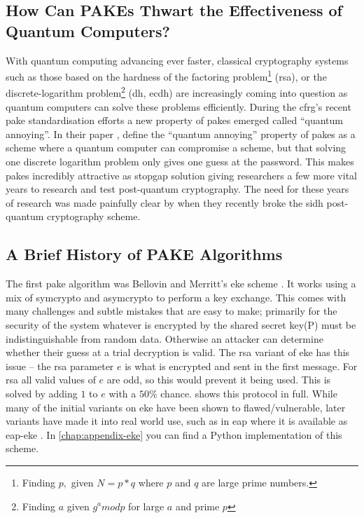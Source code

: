 \subsection{How Can PAKEs Thwart the Effectiveness of Quantum Computers?}
With quantum computing advancing ever faster, classical cryptography systems such as those based on the hardness of the factoring problem\footnote{Finding $p,$ given $N = p * q$ where $p$ and $q$ are large prime numbers.} (\gls{rsa}), or the discrete-logarithm problem\footnote{Finding $a$ given $g^a mod p$ for large $a$ and prime $p$} (\gls{dh}, \gls{ecdh}) are increasingly coming into question as quantum computers can solve these problems efficiently.
During the \gls{cfrg}'s recent \gls{pake} standardisation efforts a new property of \glspl{pake} emerged called \enquote{quantum annoying}.
In their paper  \cite{quantum-annoying}, \citeauthor{quantum-annoying} define the \enquote{quantum annoying} property of \glspl{pake} as a scheme where a quantum computer can compromise a scheme, but that solving one discrete logarithm problem only gives one guess at the password.
This makes \glspl{pake} incredibly attractive as stopgap solution giving researchers a few more vital years to research and test post-quantum cryptography.
The need for these years of research was made painfully clear by \textcite{break-sidh} when they recently broke the \gls{sidh} post-quantum cryptography scheme.

\clearpage

\subsection{A Brief History of PAKE Algorithms}
The first \gls{pake} algorithm was Bellovin and Merritt's \gls{eke} scheme \cite{eke}.
It works using a mix of \gls{symcrypto} and \gls{asymcrypto} to perform a key exchange.
This comes with many challenges and subtle mistakes that are easy to make;
primarily for the security of the system whatever is encrypted by the shared secret key(P) must be indistinguishable from random data.
Otherwise an attacker can determine whether their guess at a trial decryption is valid.
The \gls{rsa} variant of \gls{eke} has this issue -- the \gls{rsa} parameter $e$ is what is encrypted and sent in the first message.
For \gls{rsa} all valid values of $e$ are odd, so this would prevent it being used.
This is solved by adding $1$ to $e$ with a $50\%$ chance.
 shows this protocol in full. While many of the initial variants on \gls{eke} have been shown to flawed/vulnerable, later variants have made it into real world use, such as in \gls{eap} \cite{eap} where it is available as \gls{eap}-\gls{eke} \cite{eap-eke}.
In \cref{chap:appendix-eke} you can find a Python implementation of this scheme.

